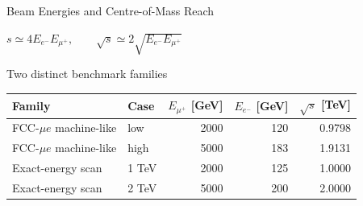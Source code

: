 \documentclass[aspectratio=1610,english]{beamer}
\newcommand{\src}[1]{\vfill{\par\color{black!65}\fontsize{6.4}{7.4}\selectfont\emph{Source:} #1\par}}
\newcommand{\key}[1]{\begin{alertblock}{Physics takeaway}\small  #1\end{alertblock}}
\begin{document}







\begin{frame}[t]{Beam Energies and Centre-of-Mass Reach}
\small

\begin{center}\large
$\displaystyle s\simeq4E_{e^-}E_{\mu^+},\qquad \sqrt{s}\simeq 2\sqrt{E_{e^-}E_{\mu^+}}$
\end{center}
\begin{block}{Two distinct benchmark families}
\begin{center}\setlength{\tabcolsep}{6pt}
\begin{tabular}{llrrr}
\toprule
Family & Case & $E_{\mu^+}$ [GeV] & $E_{e^-}$ [GeV] & $\sqrt{s}$ [TeV]\\\midrule
FCC-$\mu e$ machine-like & low & 2000 & 120 & 0.9798\\
FCC-$\mu e$ machine-like & high & 5000 & 183 & 1.9131\\
Exact-energy scan & 1 TeV & 2000 & 125 & 1.0000\\
Exact-energy scan & 2 TeV & 5000 & 200 & 2.0000\\\bottomrule
\end{tabular}\end{center}
\end{block}

\end{frame}
\end{document}
